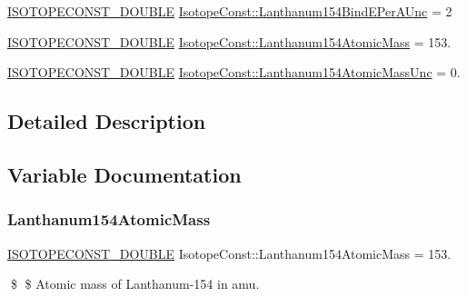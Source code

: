 \begin{DoxyCompactItemize}
\mbox{\hyperlink{group___isotope_const-_macros_ga8f45a7272ce02c0b4c65c44636ed719a}{I\+S\+O\+T\+O\+P\+E\+C\+O\+N\+S\+T\+\_\+\+D\+O\+U\+B\+LE}} \mbox{\hyperlink{group___isotope_const-_lanthanum-_la154_ga89c1a3ea913240ae6575adf845e83124}{Isotope\+Const\+::\+Lanthanum154\+Bind\+E\+Per\+A\+Unc}} = 2
\item 
\mbox{\hyperlink{group___isotope_const-_macros_ga8f45a7272ce02c0b4c65c44636ed719a}{I\+S\+O\+T\+O\+P\+E\+C\+O\+N\+S\+T\+\_\+\+D\+O\+U\+B\+LE}} \mbox{\hyperlink{group___isotope_const-_lanthanum-_la154_ga9b6a754fdd477d72bca105f0b57d3780}{Isotope\+Const\+::\+Lanthanum154\+Atomic\+Mass}} = 153.
\item 
\mbox{\hyperlink{group___isotope_const-_macros_ga8f45a7272ce02c0b4c65c44636ed719a}{I\+S\+O\+T\+O\+P\+E\+C\+O\+N\+S\+T\+\_\+\+D\+O\+U\+B\+LE}} \mbox{\hyperlink{group___isotope_const-_lanthanum-_la154_gacfd706fa989a02f042f6f1c826831884}{Isotope\+Const\+::\+Lanthanum154\+Atomic\+Mass\+Unc}} = 0.
\end{DoxyCompactItemize}


\subsection{Detailed Description}


\subsection{Variable Documentation}
\mbox{\label{group___isotope_const-_lanthanum-_la154_ga9b6a754fdd477d72bca105f0b57d3780}} 
\subsubsection{\texorpdfstring{Lanthanum154\+Atomic\+Mass}{Lanthanum154AtomicMass}}
{\footnotesize\ttfamily \mbox{\hyperlink{group___isotope_const-_macros_ga8f45a7272ce02c0b4c65c44636ed719a}{I\+S\+O\+T\+O\+P\+E\+C\+O\+N\+S\+T\+\_\+\+D\+O\+U\+B\+LE}} Isotope\+Const\+::\+Lanthanum154\+Atomic\+Mass = 153.}

\$ \$ Atomic mass of Lanthanum-\/154 in amu. \mbox{\label{group___isotope_const-_lanthanum-_la154_gacfd706fa989a02f042f6f1c826831884}} 
